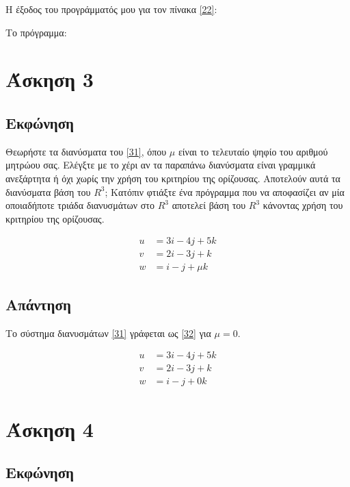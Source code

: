 \documentclass[14pt]{extreport}
\begin{document}
Η έξοδος του προγράμματός μου για τον πίνακα \eqref{22}:

Το πρόγραμμα:



\chapter{Άσκηση 3}
\section{Εκφώνηση}

Θεωρήστε τα διανύσματα του \eqref{31}, όπου $\mu$ είναι το τελευταίο ψηφίο του αριθμού μητρώου σας. Ελέγξτε με το χέρι αν τα παραπάνω διανύσματα είναι γραμμικά ανεξάρτητα ή όχι χωρίς την χρήση του κριτηρίου της ορίζουσας. Αποτελούν αυτά τα διανύσματα βάση του $R^{3}$; Κατόπιν φτιάξτε ένα πρόγραμμα που να αποφασίζει αν μία οποιαδήποτε τριάδα διανυσμάτων στο $R^{3}$ αποτελεί βάση του $R^{3}$ κάνοντας χρήση του κριτηρίου της ορίζουσας.

\begin{equation}
    \begin{aligned}
        u & = 3i - 4j + 5k  \\
        v & = 2i - 3j + k   \\
        w & = i - j + \mu k
    \end{aligned}\label{31}
\end{equation}

\newpage
\section{Απάντηση}

Το σύστημα διανυσμάτων \eqref{31} γράφεται ως \eqref{32} για $\mu = 0$.

\begin{equation}
    \begin{aligned}
        u & = 3i - 4j + 5k \\
        v & = 2i - 3j + k  \\
        w & = i - j + 0k
    \end{aligned}\label{32}
\end{equation}

\chapter{Άσκηση 4}
\section{Εκφώνηση}
\end{document}
